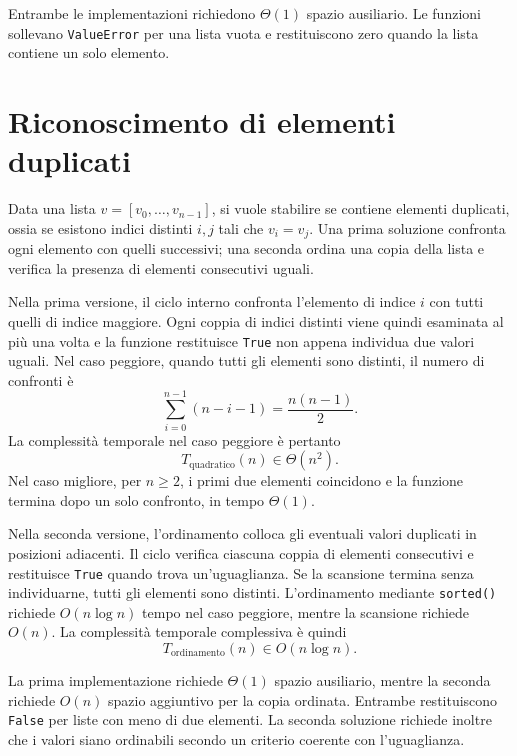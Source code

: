 Entrambe le implementazioni richiedono \(\Theta(1)\) spazio ausiliario.
Le funzioni sollevano \texttt{ValueError} per una lista vuota e
restituiscono zero quando la lista contiene un solo elemento.

\clearpage

\section{Riconoscimento di elementi duplicati}
\label{sec:fi-complessita-duplicati}

Data una lista \(v=[v_0,\ldots,v_{n-1}]\), si vuole stabilire
se contiene elementi duplicati, ossia se esistono indici distinti
\(i,j\) tali che \(v_i=v_j\). Una prima soluzione confronta ogni
elemento con quelli successivi; una seconda ordina una copia della
lista e verifica la presenza di elementi consecutivi uguali.



Nella prima versione, il ciclo interno confronta l'elemento di indice
\(i\) con tutti quelli di indice maggiore. Ogni coppia di indici
distinti viene quindi esaminata al più una volta e la funzione
restituisce \texttt{True} non appena individua due valori uguali.
Nel caso peggiore, quando tutti gli elementi sono distinti,
il numero di confronti è
\[
  \sum_{i=0}^{n-1}(n-i-1)
  =\frac{n(n-1)}2.
\]
La complessità temporale nel caso peggiore è pertanto
\[
  T_{\mathrm{quadratico}}(n)\in\Theta(n^2).
\]
Nel caso migliore, per \(n\ge2\), i primi due elementi coincidono
e la funzione termina dopo un solo confronto, in tempo \(\Theta(1)\).

Nella seconda versione, l'ordinamento colloca gli eventuali valori
duplicati in posizioni adiacenti. Il ciclo verifica ciascuna coppia
di elementi consecutivi e restituisce \texttt{True} quando trova
un'uguaglianza. Se la scansione termina senza individuarne, tutti
gli elementi sono distinti. L'ordinamento mediante \texttt{sorted()}
richiede \(O(n\log n)\) tempo nel caso peggiore, mentre la scansione
richiede \(O(n)\). La complessità temporale complessiva è quindi
\[
  T_{\mathrm{ordinamento}}(n)\in O(n\log n).
\]

La prima implementazione richiede \(\Theta(1)\) spazio ausiliario,
mentre la seconda richiede \(O(n)\) spazio aggiuntivo per la copia
ordinata. Entrambe restituiscono \texttt{False} per liste con meno
di due elementi. La seconda soluzione richiede inoltre che i valori
siano ordinabili secondo un criterio coerente con l'uguaglianza.


